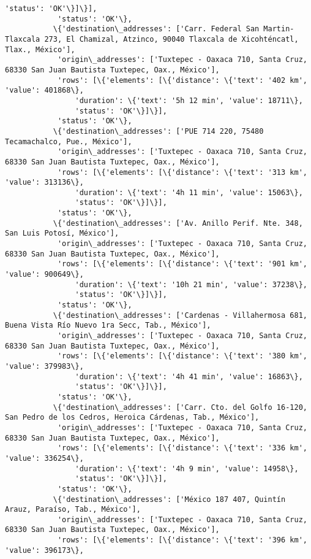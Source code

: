 \documentclass[11pt]{article}
\begin{document}
\begin{Verbatim}[commandchars=\\\{\}]
                'status': 'OK'\}]\}],
            'status': 'OK'\},
           \{'destination\_addresses': ['Carr. Federal San Martin-Tlaxcala 273, El Chamizal, Atzinco, 90040 Tlaxcala de Xicohténcatl, Tlax., México'],
            'origin\_addresses': ['Tuxtepec - Oaxaca 710, Santa Cruz, 68330 San Juan Bautista Tuxtepec, Oax., México'],
            'rows': [\{'elements': [\{'distance': \{'text': '402 km', 'value': 401868\},
                'duration': \{'text': '5h 12 min', 'value': 18711\},
                'status': 'OK'\}]\}],
            'status': 'OK'\},
           \{'destination\_addresses': ['PUE 714 220, 75480 Tecamachalco, Pue., México'],
            'origin\_addresses': ['Tuxtepec - Oaxaca 710, Santa Cruz, 68330 San Juan Bautista Tuxtepec, Oax., México'],
            'rows': [\{'elements': [\{'distance': \{'text': '313 km', 'value': 313136\},
                'duration': \{'text': '4h 11 min', 'value': 15063\},
                'status': 'OK'\}]\}],
            'status': 'OK'\},
           \{'destination\_addresses': ['Av. Anillo Perif. Nte. 348, San Luis Potosí, México'],
            'origin\_addresses': ['Tuxtepec - Oaxaca 710, Santa Cruz, 68330 San Juan Bautista Tuxtepec, Oax., México'],
            'rows': [\{'elements': [\{'distance': \{'text': '901 km', 'value': 900649\},
                'duration': \{'text': '10h 21 min', 'value': 37238\},
                'status': 'OK'\}]\}],
            'status': 'OK'\},
           \{'destination\_addresses': ['Cardenas - Villahermosa 681, Buena Vista Río Nuevo 1ra Secc, Tab., México'],
            'origin\_addresses': ['Tuxtepec - Oaxaca 710, Santa Cruz, 68330 San Juan Bautista Tuxtepec, Oax., México'],
            'rows': [\{'elements': [\{'distance': \{'text': '380 km', 'value': 379983\},
                'duration': \{'text': '4h 41 min', 'value': 16863\},
                'status': 'OK'\}]\}],
            'status': 'OK'\},
           \{'destination\_addresses': ['Carr. Cto. del Golfo 16-120, San Pedro de los Cedros, Heroica Cárdenas, Tab., México'],
            'origin\_addresses': ['Tuxtepec - Oaxaca 710, Santa Cruz, 68330 San Juan Bautista Tuxtepec, Oax., México'],
            'rows': [\{'elements': [\{'distance': \{'text': '336 km', 'value': 336254\},
                'duration': \{'text': '4h 9 min', 'value': 14958\},
                'status': 'OK'\}]\}],
            'status': 'OK'\},
           \{'destination\_addresses': ['México 187 407, Quintín Arauz, Paraíso, Tab., México'],
            'origin\_addresses': ['Tuxtepec - Oaxaca 710, Santa Cruz, 68330 San Juan Bautista Tuxtepec, Oax., México'],
            'rows': [\{'elements': [\{'distance': \{'text': '396 km', 'value': 396173\},

\end{Verbatim}
\end{document}
